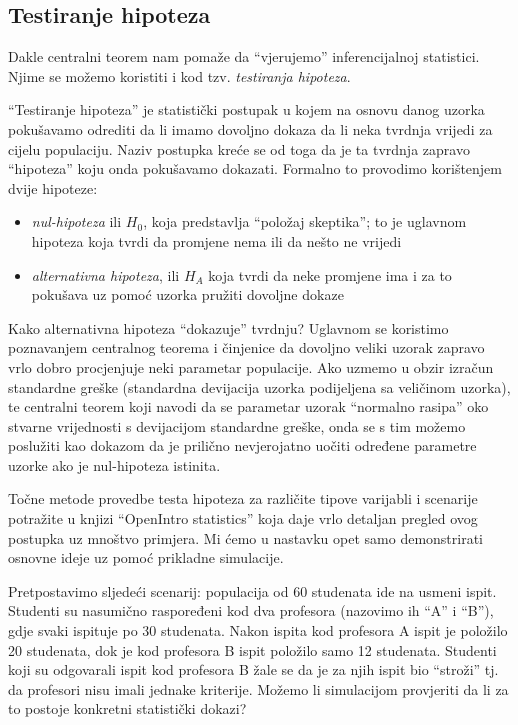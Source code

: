 \documentclass[]{book}
\providecommand{\tightlist}{%
  \setlength{\itemsep}{0pt}\setlength{\parskip}{0pt}}
\theoremstyle{definition}
\theoremstyle{definition}
\theoremstyle{definition}
\theoremstyle{remark}
\begin{document}
\subsection{Testiranje hipoteza}\label{testiranje-hipoteza}

Dakle centralni teorem nam pomaže da ``vjerujemo'' inferencijalnoj
statistici. Njime se možemo koristiti i kod tzv. \emph{testiranja
hipoteza}.

``Testiranje hipoteza'' je statistički postupak u kojem na osnovu danog
uzorka pokušavamo odrediti da li imamo dovoljno dokaza da li neka
tvrdnja vrijedi za cijelu populaciju. Naziv postupka kreće se od toga da
je ta tvrdnja zapravo ``hipoteza'' koju onda pokušavamo dokazati.
Formalno to provodimo korištenjem dvije hipoteze:

\begin{itemize}
\tightlist
\item
  \emph{nul-hipoteza} ili \(H_0\), koja predstavlja ``položaj
  skeptika''; to je uglavnom hipoteza koja tvrdi da promjene nema ili da
  nešto ne vrijedi
\item
  \emph{alternativna hipoteza}, ili \(H_A\) koja tvrdi da neke promjene
  ima i za to pokušava uz pomoć uzorka pružiti dovoljne dokaze
\end{itemize}

Kako alternativna hipoteza ``dokazuje'' tvrdnju? Uglavnom se koristimo
poznavanjem centralnog teorema i činjenice da dovoljno veliki uzorak
zapravo vrlo dobro procjenjuje neki parametar populacije. Ako uzmemo u
obzir izračun standardne greške (standardna devijacija uzorka
podijeljena sa veličinom uzorka), te centralni teorem koji navodi da se
parametar uzorak ``normalno rasipa'' oko stvarne vrijednosti s
devijacijom standardne greške, onda se s tim možemo poslužiti kao
dokazom da je prilično nevjerojatno uočiti određene parametre uzorke ako
je nul-hipoteza istinita.

Točne metode provedbe testa hipoteza za različite tipove varijabli i
scenarije potražite u knjizi ``OpenIntro statistics'' koja daje vrlo
detaljan pregled ovog postupka uz mnoštvo primjera. Mi ćemo u nastavku
opet samo demonstrirati osnovne ideje uz pomoć prikladne simulacije.

Pretpostavimo sljedeći scenarij: populacija od 60 studenata ide na
usmeni ispit. Studenti su nasumično raspoređeni kod dva profesora
(nazovimo ih ``A'' i ``B''), gdje svaki ispituje po 30 studenata. Nakon
ispita kod profesora A ispit je položilo 20 studenata, dok je kod
profesora B ispit položilo samo 12 studenata. Studenti koji su
odgovarali ispit kod profesora B žale se da je za njih ispit bio
``stroži'' tj. da profesori nisu imali jednake kriterije. Možemo li
simulacijom provjeriti da li za to postoje konkretni statistički dokazi?
\end{document}

